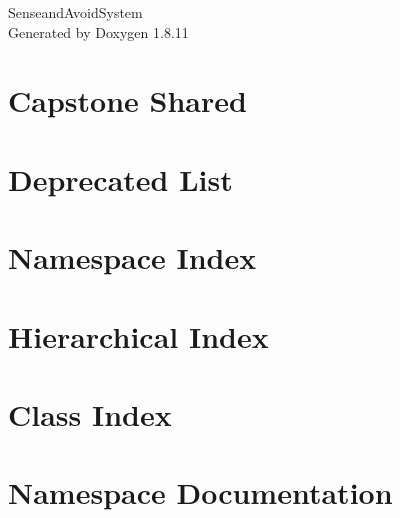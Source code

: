 \documentclass[twoside]{book}
\newcommand{\+}{\discretionary{\mbox{\scriptsize$\hookleftarrow$}}{}{}}
\newcommand{\clearemptydoublepage}{%
  \newpage{\pagestyle{empty}\cleardoublepage}%
}
\begin{document}
\hypersetup{pageanchor=false,
             bookmarksnumbered=true,
             pdfencoding=unicode
            }
\begin{titlepage}
\vspace*{7cm}
\begin{center}%
{\Large Senseand\+Avoid\+System }\\
\vspace*{1cm}
{\large Generated by Doxygen 1.8.11}\\
\end{center}
\end{titlepage}
\clearemptydoublepage
\tableofcontents
\clearemptydoublepage
{}
\hypersetup{pageanchor=true}

\chapter{Capstone Shared}
\label{md__home_andrea_ClionProjects_saas_lib_gp_capstone-shared_README}
\hypertarget{md__home_andrea_ClionProjects_saas_lib_gp_capstone-shared_README}{}

\chapter{Deprecated List}
\label{deprecated}
\hypertarget{deprecated}{}

\chapter{Namespace Index}

\chapter{Hierarchical Index}

\chapter{Class Index}

\chapter{Namespace Documentation}







\end{document}

